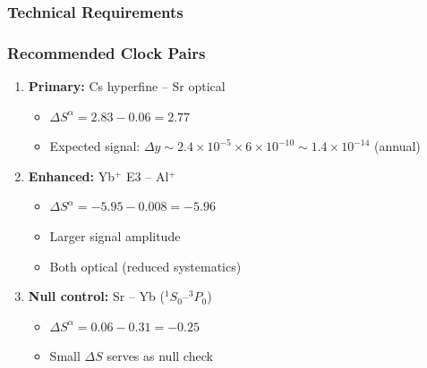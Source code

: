 \subsubsection{Technical Requirements}

\begin{table}[h!]
\centering
\caption{Clock comparison technical specifications.}
\label{tab:clock_specs}
\end{table}

\subsubsection{Recommended Clock Pairs}

\begin{enumerate}
\item \textbf{Primary:} Cs hyperfine -- Sr optical
   \begin{itemize}
   \item $\Delta S^\alpha = 2.83 - 0.06 = 2.77$
   \item Expected signal: $\Delta y \sim 2.4 \times 10^{-5} \times 6 \times 10^{-10} \sim 1.4 \times 10^{-14}$ (annual)
   \end{itemize}

\item \textbf{Enhanced:} Yb$^+$ E3 -- Al$^+$
   \begin{itemize}
   \item $\Delta S^\alpha = -5.95 - 0.008 = -5.96$
   \item Larger signal amplitude
   \item Both optical (reduced systematics)
   \end{itemize}

\item \textbf{Null control:} Sr -- Yb ($^1S_0$--$^3P_0$)
   \begin{itemize}
   \item $\Delta S^\alpha = 0.06 - 0.31 = -0.25$
   \item Small $\Delta S$ serves as null check
   \end{itemize}
\end{enumerate}

